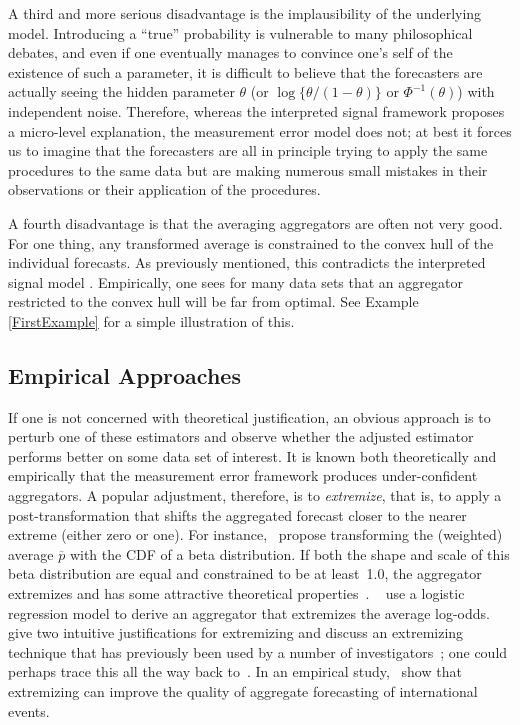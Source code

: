 \documentclass[11pt]{article}
\theoremstyle{definition}
\theoremstyle{definition}
\def\pb{\overline{p}}
\begin{document}
A third and more serious disadvantage is the implausibility of the underlying 
model. Introducing a ``true'' probability is vulnerable to many philosophical debates, and even if one eventually manages to convince one's self of the existence of such a parameter, it is difficult to believe that the forecasters
are actually seeing the hidden parameter $\theta$ (or $\log\{\theta/(1-\theta)\}$ 
or $\Phi^{-1}(\theta)$) with independent noise. Therefore, whereas the
interpreted signal framework proposes a micro-level explanation,
the measurement error model does not; at best it forces us to 
imagine that the forecasters are all in principle trying
to apply the same procedures to the same data but are making
numerous small mistakes in their observations or their application 
of the procedures.  

A fourth disadvantage is that the averaging aggregators are often not very good.  For one thing,
any transformed average is constrained to the convex hull of the
individual forecasts.  As previously mentioned, this contradicts the 
interpreted signal model \citep{parunak2013characterizing}.  Empirically, one sees for many data 
sets that an aggregator restricted to the convex hull will be far 
from optimal. See Example \ref{FirstExample} for a simple illustration of this. 

\subsection{Empirical Approaches}
\label{ss:empirical}

If one is not concerned with theoretical justification, an obvious
approach is to perturb one of these estimators and observe 
whether the adjusted estimator performs better on some data set
of interest.  It is known both theoretically and empirically
that the measurement error framework produces under-confident 
aggregators.  A popular adjustment, therefore, is to {\em extremize},
that is, to apply a post-transformation that shifts the 
aggregated forecast closer to the nearer extreme (either zero or one).
For instance,~\citet{Ranjan08} propose transforming
the (weighted) average $\pb$ with the CDF of a beta distribution.  If both the shape and scale of this 
beta distribution are equal and constrained to be at least~1.0,
the aggregator extremizes and has some attractive theoretical
properties~\citep{Wallsten2001}.  ~\citet{satopaa}
use a logistic regression model to derive an aggregator that extremizes
the average log-odds.  ~\citet{baron2014two} give two intuitive
justifications for extremizing and discuss an extremizing technique
that has previously been used by a number of investigators~\citep{Erev1994,
shlomi2010subjective}; one could perhaps trace this all the way back
to~\citet{karmarkar1978subjectively}.  
In an empirical study,~\citet{mellers2014psychological} show that 
extremizing can improve the quality of aggregate forecasting of 
international events.  
\end{document}
